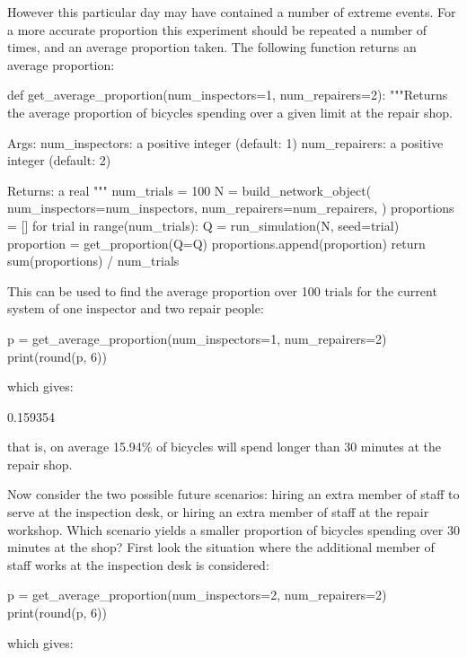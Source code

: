 However this particular day may have contained a number of extreme events.
For a more accurate proportion this experiment should be repeated a number of
times, and an average proportion taken.
The following function returns an average proportion:

\begin{pyin}
def get_average_proportion(num_inspectors=1, num_repairers=2):
    """Returns the average proportion of bicycles spending over a
    given limit at the repair shop.

    Args:
        num_inspectors: a positive integer (default: 1)
        num_repairers: a positive integer (default: 2)

    Returns:
        a real
    """
    num_trials = 100
    N = build_network_object(
        num_inspectors=num_inspectors,
        num_repairers=num_repairers,
    )
    proportions = []
    for trial in range(num_trials):
        Q = run_simulation(N, seed=trial)
        proportion = get_proportion(Q=Q)
        proportions.append(proportion)
    return sum(proportions) / num_trials
\end{pyin}

This can be used to find the average proportion over 100 trials for the current
system of one inspector and two repair people:

\begin{pyin}
p = get_average_proportion(num_inspectors=1, num_repairers=2)
print(round(p, 6))
\end{pyin}

which gives:

\begin{pyout}
0.159354
\end{pyout}

that is, on average 15.94\% of bicycles will spend longer than 30 minutes at the
repair shop.

Now consider the two possible future scenarios: hiring an
extra member of staff to serve at the inspection desk, or hiring an extra member
of staff at the repair workshop. Which scenario yields a smaller proportion of
bicycles spending over 30 minutes at the shop? First look
the situation where the additional member of staff works at the inspection desk
is considered:

\begin{pyin}
p = get_average_proportion(num_inspectors=2, num_repairers=2)
print(round(p, 6))
\end{pyin}

which gives:

